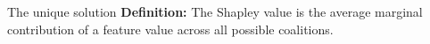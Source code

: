 \begin{frame}{The unique solution}
     \textbf{Definition:} The Shapley value is the average marginal contribution of a feature value across all possible coalitions.
    
    

    


\end{frame}
